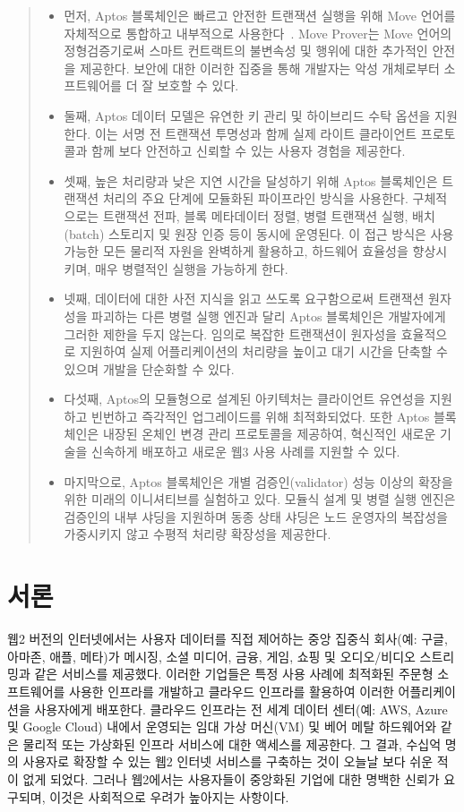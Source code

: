 \documentclass{article}
\begin{document}
\begin{abstract}
 \begin{itemize}
  \item 먼저, Aptos 블록체인은 빠르고 안전한 트랜잭션 실행을 위해 Move 언어를 자체적으로 통합하고 내부적으로 사용한다~\cite{move_github}. Move Prover는 Move 언어의 정형검증기로써 스마트 컨트랙트의 불변속성 및 행위에 대한 추가적인 안전을 제공한다. 보안에 대한 이러한 집중을 통해 개발자는 악성 개체로부터 소프트웨어를 더 잘 보호할 수 있다.
  \item 둘째, Aptos 데이터 모델은 유연한 키 관리 및 하이브리드 수탁 옵션을 지원한다. 이는 서명 전 트랜잭션 투명성과 함께 실제 라이트 클라이언트 프로토콜과 함께 보다 안전하고 신뢰할 수 있는 사용자 경험을 제공한다. 
  \item 셋째, 높은 처리량과 낮은 지연 시간을 달성하기 위해 Aptos 블록체인은 트랜잭션 처리의 주요 단계에 모듈화된 파이프라인 방식을 사용한다. 구체적으로는 트랜잭션 전파, 블록 메타데이터 정렬, 병렬 트랜잭션 실행, 배치(batch) 스토리지 및 원장 인증 등이 동시에 운영된다. 이 접근 방식은 사용 가능한 모든 물리적 자원을 완벽하게 활용하고, 하드웨어 효율성을 향상시키며, 매우 병렬적인 실행을 가능하게 한다.
  \item 넷째, 데이터에 대한 사전 지식을 읽고 쓰도록 요구함으로써 트랜잭션 원자성을 파괴하는 다른 병렬 실행 엔진과 달리 Aptos 블록체인은 개발자에게 그러한 제한을 두지 않는다. 임의로 복잡한 트랜잭션이 원자성을 효율적으로 지원하여 실제 어플리케이션의 처리량을 높이고 대기 시간을 단축할 수 있으며 개발을 단순화할 수 있다.
  \item 다섯째, Aptos의 모듈형으로 설계된 아키텍처는 클라이언트 유연성을 지원하고 빈번하고 즉각적인 업그레이드를 위해 최적화되었다. 또한 Aptos 블록체인은 내장된 온체인 변경 관리 프로토콜을 제공하여, 혁신적인 새로운 기술을 신속하게 배포하고 새로운 웹3 사용 사례를 지원할 수 있다.
  \item 마지막으로, Aptos 블록체인은 개별 검증인(validator) 성능 이상의 확장을 위한 미래의 이니셔티브를 실험하고 있다. 모듈식 설계 및 병렬 실행 엔진은 검증인의 내부 샤딩을 지원하며 동종 상태 샤딩은 노드 운영자의 복잡성을 가중시키지 않고 수평적 처리량 확장성을 제공한다.
\end{itemize}

\end{abstract}

\section{서론}
\label{sec:introduction}

웹2 버전의 인터넷에서는 사용자 데이터를 직접 제어하는 중앙 집중식 회사(예: 구글, 아마존, 애플, 메타)가 메시징, 소셜 미디어, 금융, 게임, 쇼핑 및 오디오/비디오 스트리밍과 같은 서비스를 제공했다. 이러한 기업들은 특정 사용 사례에 최적화된 주문형 소프트웨어를 사용한 인프라를 개발하고 클라우드 인프라를 활용하여 이러한 어플리케이션을 사용자에게 배포한다. 클라우드 인프라는 전 세계 데이터 센터(예: AWS, Azure 및 Google Cloud) 내에서 운영되는 임대 가상 머신(VM) 및 베어 메탈 하드웨어와 같은 물리적 또는 가상화된 인프라 서비스에 대한 액세스를 제공한다. 그 결과, 수십억 명의 사용자로 확장할 수 있는 웹2 인터넷 서비스를 구축하는 것이 오늘날 보다 쉬운 적이 없게 되었다. 그러나 웹2에서는 사용자들이 중앙화된 기업에 대한 명백한 신뢰가 요구되며, 이것은 사회적으로 우려가 높아지는 사항이다.
\end{document}
